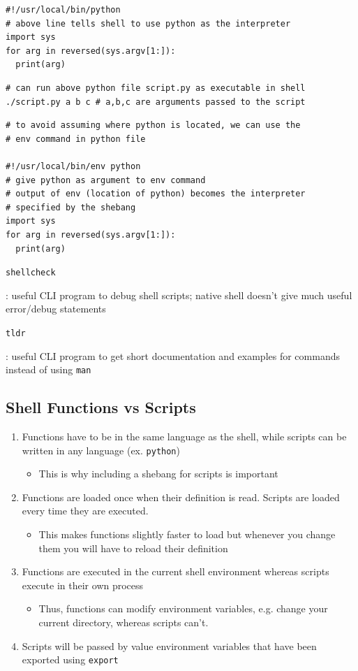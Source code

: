 \documentclass[letterpaper,12pt]{article}
\newcommand*{\lstitem}[1]{
  \setbox0\hbox{\lstinline{#1}}
  \item[\usebox0]
}
\begin{document}
\begin{lstlisting}
#!/usr/local/bin/python
# above line tells shell to use python as the interpreter
import sys
for arg in reversed(sys.argv[1:]):
  print(arg)
\end{lstlisting}

\begin{lstlisting}
# can run above python file script.py as executable in shell
./script.py a b c # a,b,c are arguments passed to the script
\end{lstlisting}

\begin{lstlisting}
# to avoid assuming where python is located, we can use the
# env command in python file

#!/usr/local/bin/env python
# give python as argument to env command
# output of env (location of python) becomes the interpreter
# specified by the shebang
import sys
for arg in reversed(sys.argv[1:]):
  print(arg)
\end{lstlisting}

\begin{description}
 \lstitem{shellcheck}: useful CLI program to debug shell scripts; native shell doesn't give much useful error/debug statements
 \lstitem{tldr}: useful CLI program to get short documentation and examples for commands instead of using \lstinline{man}
\end{description}

\subsection{Shell Functions vs Scripts}
\begin{enumerate}
 \item Functions have to be in the same language as the shell, while scripts can be written in any language (ex. \lstinline{python})
       \begin{itemize}
        \item This is why including a shebang for scripts is important
       \end{itemize}
 \item Functions are loaded once when their definition is read. Scripts are loaded every time they are executed.
       \begin{itemize}
        \item This makes functions slightly faster to load but whenever you change them you will have to reload their definition
       \end{itemize}
 \item  Functions are executed in the current shell environment whereas scripts execute in their own process
       \begin{itemize}
        \item Thus, functions can modify environment variables, e.g. change your current directory, whereas scripts can’t.
       \end{itemize}
 \item Scripts will be passed by value environment variables that have been exported using \lstinline{export}
\end{enumerate}
\end{document}
